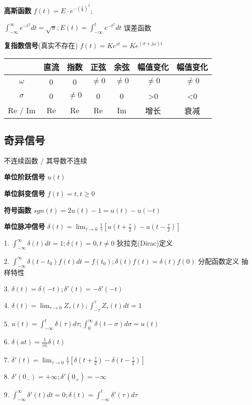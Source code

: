 \textbf{高斯函数} $f(t)=E \cdot e^{-(\frac{t}{\sigma})^2};$

$\int ^{\infty} _{-\infty} e^{-t^2}dt = \sqrt{\pi};E(t)=\int ^{t} _{-\infty} e^{-t^2}dt$ 误差函数

\textbf{复指数信号}(真实不存在) $f(t) = Ke^{st} = Ke^{(\sigma + j\omega)t}$

\begin{tabular}{c|cccccc}
& 直流 & 指数 & 正弦 & 余弦 & 幅值变化 & 幅值变化 \\
\hline
$\omega$ & 0 & 0 & $\ne0$ & $\ne0$ & $\ne0$ & $\ne0$ \\
$\sigma$ & 0 & $\ne0$ & 0 & 0 & >0 & <0 \\
Re{} / Im{} & Re{} & Re{} & Re{} & Im{} & 增长 & 衰减 \\
\end{tabular}

\subsection*{奇异信号}

不连续函数 / 其导数不连续

\textbf{单位阶跃信号} $u(t)$

\textbf{单位斜变信号} $f(t) = t, t\ge 0$

\textbf{符号函数} $sgn(t) = 2u(t) - 1 = u(t) - u(-t)$

\textbf{单位脉冲信号} $\delta (t) = \lim_{\tau\to0}\frac{1}{\tau}[u(t+\frac{\tau}{2})-u(t-\frac{\tau}{2})]$

1. $\int ^{\infty} _{-\infty} \delta (t)dt = 1; \delta (t) = 0, t \ne 0$ 狄拉克(Dirac)定义

2. $\int ^{\infty} _{-\infty} \delta (t-t_0)f(t)dt = f(t_0); \delta (t)f(t) = \delta(t)f(0)$ 分配函数定义 抽样特性

3. $\delta(t) = \delta(-t);\delta'(t) = -\delta'(-t)$

4. $\delta(t) = \lim_{\tau\to0}Z_\tau(t);\int ^{\tau} _{-\tau}Z_\tau(t)dt = 1$

5. $u(t)=\int ^t _{-\infty} \delta(\tau)d\tau; \int ^{\infty} _{0} \delta(t-\sigma)d\sigma = u(t)$

6. $\delta(at) = \frac{1}{|a|}\delta(t)$

7. $\delta'(t)=\lim_{\tau\to0}\frac{1}{\tau}[\delta(t+\frac{\tau}{2})-\delta(t-\frac{\tau}{2})]$ 

8. $\delta'(0_-) = + \infty ; \delta'(0_+) = - \infty$

9. $\int ^{\infty} _{-\infty} \delta' (t)dt = 0; \delta(t)=\int ^t _{-\infty} \delta'(\tau)d\tau$

